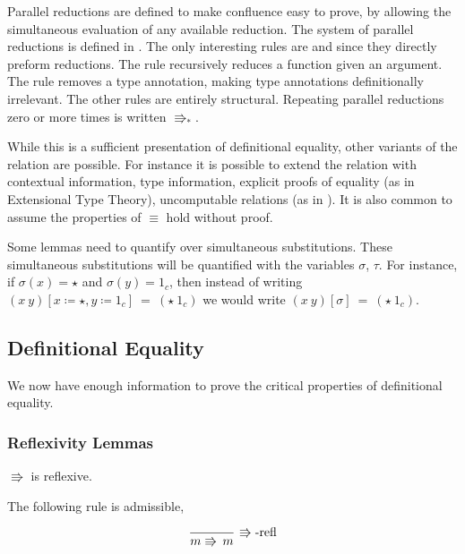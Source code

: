 Parallel reductions are defined to make confluence easy to prove, by allowing the simultaneous evaluation of any available reduction.
The system of parallel reductions is defined in .
The only interesting rules are  and  since they directly preform reductions.
The  rule recursively reduces a function given an argument.
The  rule removes a type annotation, making type annotations definitionally irrelevant.
The other rules are entirely structural.
Repeating parallel reductions zero or more times is written $\Rrightarrow_{\ast}$.

While this is a sufficient presentation of definitional equality, other variants of the relation are possible.
For instance it is possible to extend the relation with contextual information, type information, explicit proofs of equality (as in Extensional Type Theory), uncomputable relations (as in \cite{jia2010dependent}).
It is also common to assume the properties of $\equiv$ hold without proof.

Some lemmas need to quantify over simultaneous substitutions.
These simultaneous substitutions will be quantified with the variables $\sigma$, $\tau$.
For instance, if $\sigma(x) = \star$ and $\sigma(y) = 1_c$, then instead of writing $(x\ y)[x \coloneqq \star,y \coloneqq 1_c]\ =\ (\star\ 1_c)$ we would write $(x\ y)[\sigma]\ =\ (\star\ 1_c)$.


\subsection{Definitional Equality}

We now have enough information to prove the critical properties of definitional equality.

\subsubsection{Reflexivity Lemmas}
\begin{lem}
$\Rrightarrow$ is reflexive.

The following rule is admissible,

\[
\frac{\,}{m\Rrightarrow\,m}\,\operatorname{\Rrightarrow-refl}
\]
\end{lem}

